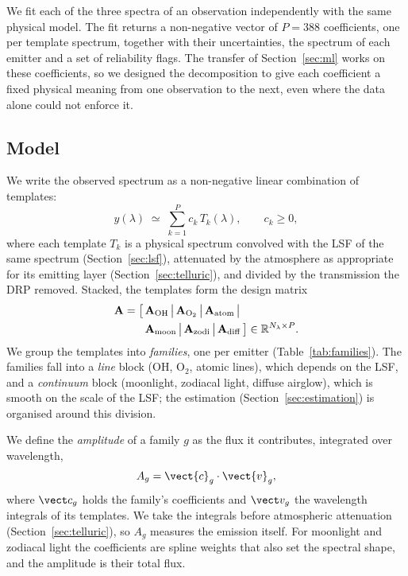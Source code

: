 We fit each of the three spectra of an observation independently with the
same physical model. The fit returns a non-negative vector of $P = 388$
coefficients, one per template spectrum, together with their uncertainties,
the spectrum of each emitter and a set of reliability flags. The transfer of
Section~\ref{sec:ml} works on these coefficients, so we designed the
decomposition to give each coefficient a fixed physical meaning from one
observation to the next, even where the data alone could not enforce it.

\subsection{Model}
\label{sec:model}

We write the observed spectrum as a non-negative linear combination of
templates:
\begin{equation}
  y(\lambda) \;\simeq\; \sum_{k=1}^{P} c_k\,T_k(\lambda), \qquad c_k \ge 0 ,
  \label{eq:model}
\end{equation}
where each template $T_k$ is a physical spectrum convolved with the LSF
of the same spectrum (Section~\ref{sec:lsf}), attenuated by the
atmosphere as appropriate for its emitting layer
(Section~\ref{sec:telluric}), and divided by the transmission the DRP
removed. Stacked, the templates form the design matrix
\begin{equation}
\begin{split}
  \mathbf{A} = \big[\,&\mathbf{A}_{\rm OH}\,\big|\,\mathbf{A}_{\rm O_2}\,\big|\,
  \mathbf{A}_{\rm atom}\,\big|\\
  &\mathbf{A}_{\rm moon}\,\big|\,\mathbf{A}_{\rm zodi}\,\big|\,
  \mathbf{A}_{\rm diff}\,\big]
  \in \mathbb{R}^{N_\lambda\times P}.
\end{split}
\end{equation}
We group the templates into \emph{families}, one per emitter
(Table~\ref{tab:families}). The families fall into a \emph{line} block (OH,
O$_2$, atomic lines), which depends on the LSF, and a \emph{continuum} block
(moonlight, zodiacal light, diffuse airglow), which is smooth on the scale
of the LSF; the estimation (Section~\ref{sec:estimation}) is organised
around this division.

We define the \emph{amplitude} of a family $g$ as the flux it contributes,
integrated over wavelength,
\begin{equation}
  A_g = \vect{c}_g\cdot\vect{v}_g ,
  \label{eq:amplitude}
\end{equation}
where $\vect c_g$ holds the family's coefficients and $\vect v_g$ the
wavelength integrals of its templates. We take the integrals before
atmospheric attenuation (Section~\ref{sec:telluric}), so $A_g$ measures the
emission itself. For moonlight and zodiacal light the coefficients are
spline weights that also set the spectral shape, and the amplitude is their
total flux.

